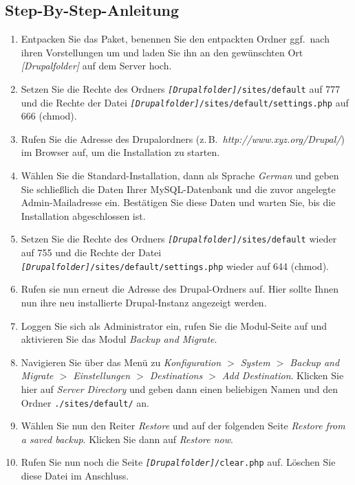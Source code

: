 \documentclass[a4paper,11pt,twoside]{article}
\begin{document}
\subsection{Step-By-Step-Anleitung}
\begin{enumerate}
\item Entpacken Sie das Paket, benennen Sie den entpackten Ordner ggf.\ nach
  ihren Vorstellungen um und laden Sie ihn an den gewünschten Ort
  \textit{[Drupalfolder]} auf dem Server hoch.
\item Setzen Sie die Rechte des Ordners
  \texttt{\textit{[Drupalfolder]}/sites/default} auf 777 und die Rechte der
  Datei \texttt{\textit{[Drupalfolder]}/sites/default/settings.php} auf 666
  (chmod).
\item Rufen Sie die Adresse des Drupalordners
  (z.\,B.\ \textit{http://www.xyz.org/Drupal/}) im Browser auf, um die
  Installation zu starten.
\item Wählen Sie die Standard-Installation, dann als Sprache \emph{German} und
  geben Sie schließlich die Daten Ihrer MySQL-Datenbank und die zuvor
  angelegte Admin-Mailadresse ein. Bestätigen Sie diese Daten und warten Sie,
  bis die Installation abgeschlossen ist.
\item Setzen Sie die Rechte des Ordners
  \texttt{\textit{[Drupalfolder]}/sites/default} wieder auf 755 und die Rechte
  der Datei \texttt{\textit{[Drupalfolder]}/sites/default/settings.php} wieder
  auf 644 (chmod).
\item Rufen sie nun erneut die Adresse des Drupal-Ordners auf. Hier sollte
  Ihnen nun ihre neu installierte Drupal-Instanz angezeigt werden.
\item Loggen Sie sich als Administrator ein, rufen Sie die Modul-Seite auf und
  aktivieren Sie das Modul \emph{Backup and Migrate}.
\item Navigieren Sie über das Menü zu \emph{Konfiguration $>$ System $>$
  Backup and Migrate $>$ Einstellungen $>$ Destinations $>$ Add Destination}.
  Klicken Sie hier auf \emph{Server Directory} und geben dann einen beliebigen
  Namen und den Ordner \texttt{./sites/default/} an.
\item Wählen Sie nun den Reiter \emph{Restore} und auf der folgenden Seite
  \emph{Restore from a saved backup}. Klicken Sie dann auf \emph{Restore now}.
\item Rufen Sie nun noch die Seite \texttt{\textit{[Drupalfolder]}/clear.php}
  auf.  Löschen Sie diese Datei im Anschluss.
\end{enumerate}
\end{document}
